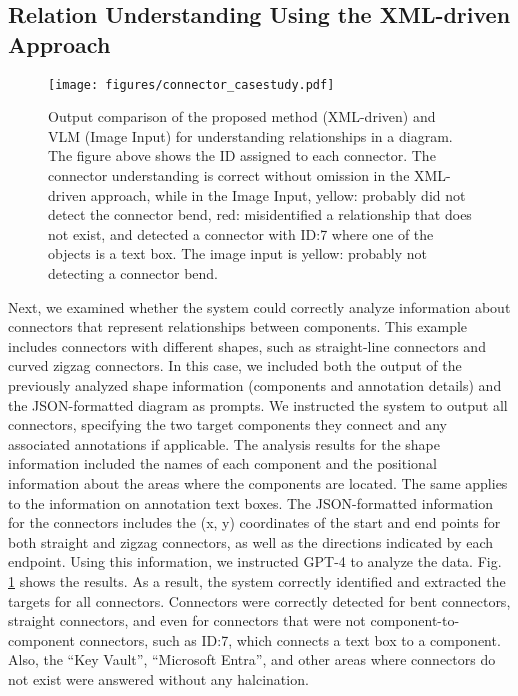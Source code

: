 \subsection{Relation Understanding Using the XML-driven Approach}
\begin{figure}[tbp]
    \centering
    \texttt{[image: figures/connector\_casestudy.pdf]}
    \caption{\small
    Output comparison of the proposed method (XML-driven) and VLM (Image Input) for understanding relationships in a diagram.
The figure above shows the ID assigned to each connector. The connector understanding is correct without omission in the XML-driven approach, while in the Image Input, yellow: probably did not detect the connector bend, red: misidentified a relationship that does not exist, and detected a connector with ID:7 where one of the objects is a text box. The image input is yellow: probably not detecting a connector bend.}
    \label{fig:connector_cs}
\end{figure}

Next, we examined whether the system could correctly analyze information about connectors that represent relationships between components. This example includes connectors with different shapes, such as straight-line connectors and curved zigzag connectors. In this case, we included both the output of the previously analyzed shape information (components and annotation details) and the JSON-formatted diagram as prompts. We instructed the system to output all connectors, specifying the two target components they connect and any associated annotations if applicable. The analysis results for the shape information included the names of each component and the positional information about the areas where the components are located. The same applies to the information on annotation text boxes. The JSON-formatted information for the connectors includes the (x, y) coordinates of the start and end points for both straight and zigzag connectors, as well as the directions indicated by each endpoint. Using this information, we instructed GPT-4 to analyze the data. Fig. \ref{fig:connector_cs} shows the results. As a result, the system correctly identified and extracted the targets for all connectors. Connectors were correctly detected for bent connectors, straight connectors, and even for connectors that were not component-to-component connectors, such as ID:7, which connects a text box to a component.
Also, the “Key Vault”, “Microsoft Entra”, and other areas where connectors do not exist were answered without any halcination.

